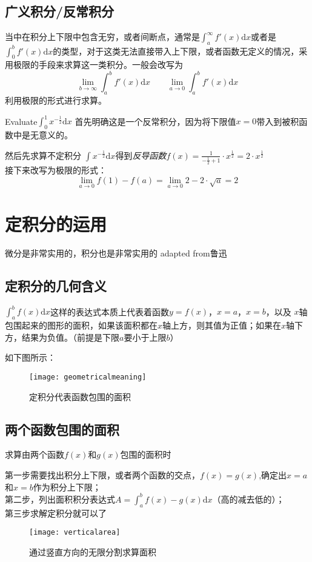 \subsection*{广义积分/反常积分}
当中在积分上下限中包含无穷，或者间断点，通常是$\int_{a}^{\infty}f'(x)\mathrm{d} x$或者是$\int_{0}^{b} f'(x)\mathrm{d} x$的类型，对于这类无法直接带入上下限，或者函数无定义的情况，采用极限的手段来求算这一类积分。一般会改写为
\[
	\lim_{b\to \infty} \int_{a}^{b} f'(x) \mathrm{d} x \qquad \lim_{a\to 0} \int_{a}^{b} f'(x) \mathrm{d} x
\]
利用极限的形式进行求算。
\begin{ExampleBox}
Evaluate$\int_{0}^{1}x^{-\frac{1}{2}} \mathrm{d} x$
\tcblower
首先明确这是一个反常积分，因为将下限值$x=0$带入到被积函数中是无意义的。

然后先求算不定积分 $\int x^{-\frac{1}{2}} \mathrm{d} x$得到\emph{反导函数}$f(x)=\frac{1}{-\frac{1}{2}+1}\cdot x^{\frac{1}{2}}=2\cdot x^{\frac{1}{2}}$\\

接下来改写为极限的形式：
\[
	\lim_{a\to 0} f(1)-f(a) =\lim_{a\to 0} 2-2\cdot \sqrt{a}=2
\]
\end{ExampleBox}
\clearpage


\section{定积分的运用}
\label{sec:Application of Definite Integral}
微分是非常实用的，积分也是非常实用的  \makebox{}\hfill adapted from鲁迅

\subsection*{定积分的几何含义}
$\int_{a}^{b} f(x) \mathrm{d} x$这样的表达式本质上代表着函数$y=f(x)$，$x=a$，$x=b$，以及 $x$轴包围起来的图形的面积，如果该面积都在$x$轴上方，则其值为正值；如果在$x$轴下方，结果为负值。（前提是下限$a$要小于上限$b$）

如下图所示：
\begin{figure}[H]
\centering
\texttt{[image: geometricalmeaning]}
\caption{定积分代表函数包围的面积}
\end{figure}




\subsection*{两个函数包围的面积}
求算由两个函数$f(x)$和$g(x)$包围的面积时
\begin{SummBox}
第一步需要找出积分上下限，或者两个函数的交点，$f(x)=g(x)$,确定出$x=a$和$x=b$作为积分上下限；\\
第二步，列出面积积分表达式$A=\int_{a}^{b} f(x)-g(x) \mathrm{d} x$（高的减去低的）；\\
第三步求解定积分就可以了
\begin{figure}[H]
\centering
\texttt{[image: verticalarea]}
\caption{通过竖直方向的无限分割求算面积}
\end{figure}
\end{SummBox}

